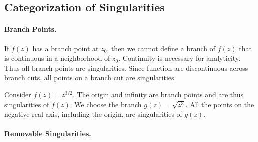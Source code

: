 \subsection{Categorization of Singularities}



\paragraph{Branch Points.}
If $f(z)$ has a branch point at $z_0$, then we cannot define a branch
of $f(z)$ that is continuous in a neighborhood of $z_0$.  Continuity
is necessary for analyticity.  Thus all branch points are singularities.
Since function are discontinuous across branch cuts, all points on a
branch cut are singularities.


\begin{Example}
  Consider $f(z) = z^{3/2}$.  The origin and infinity are branch points and are 
  thus singularities of $f(z)$.  We choose the branch $g(z) = \sqrt{z^3}$.  
  All the points on the negative real axis, including the origin, are 
  singularities of $g(z)$.
\end{Example}





\paragraph{Removable Singularities.}




